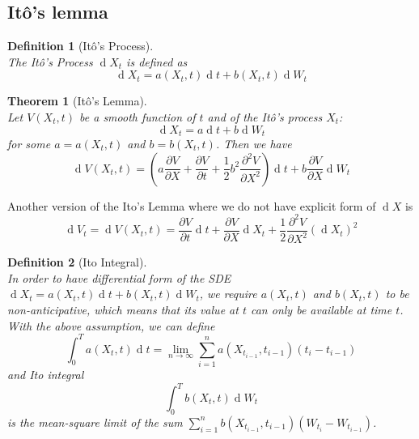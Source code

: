 \documentclass[12pt]{article}
\newtheorem{definition}{Definition}[section]
\newtheorem{theorem}{Theorem}[section]
\theoremstyle{definition}
\DeclareMathOperator{\diff}{d}
\begin{document}
\subsection{It\^{o}'s lemma}
\begin{definition}[It\^{o}'s Process]
\hfill\\\normalfont The It\^{o}'s Process $\diff X_t$ is defined as 
\[
\diff X_t = a(X_t,t)\diff t + b(X_t,t)\diff W_t
\]
\end{definition}
\begin{theorem}[It\^{o}'s Lemma]
\hfill\\\normalfont Let $V(X_t,t)$ be a smooth function of $t$ and of the It\^{o}'s process $X_t$:
\[
\diff X_t = a\diff t + b\diff W_t
\]
for some $a=a(X_t,t)$ and $b=b(X_t,t)$. Then we have
\[
\diff V(X_t,t) = (a\frac{\partial V}{\partial X}+\frac{\partial V}{\partial t}+\frac{1}{2}b^2\frac{\partial^2 V}{\partial X^2})\diff t+b\frac{\partial V}{\partial X}\diff W_t
\]
\end{theorem}
Another version of the Ito's Lemma where we do not have explicit form of $\diff X$ is
\[
\diff V_t = \diff V(X_t,t) = \frac{\partial V}{\partial t}\diff t+\frac{\partial V}{\partial X}\diff X_t + \frac{1}{2}\frac{\partial^2 V}{\partial X^2}(\diff X_t)^2 
\]
\begin{definition}[Ito Integral]
\hfill\\\normalfont In order to have differential form of the SDE $\diff X_t = a(X_t,t)\diff t+b(X_t,t)\diff W_t$, we require $a(X_t,t)$ and $b(X_t,t)$ to be non-anticipative, which means that its value at $t$ can only be available at time $t$.\\
With the above assumption, we can define
\[
\int_0^T a(X_t,t)\diff t = \lim_{n\to \infty}\sum_{i=1}^n a(X_{t_{i-1}}, t_{i-1})(t_i-t_{i-1})
\]
and Ito integral
\[
\int_0^T b(X_t,t)\diff W_t
\]
is the mean-square limit of the sum $\sum_{i=1}^n b(X_{t_{i-1}}, t_{i-1})(W_{t_i}-W_{t_{i-1}})$.
\end{definition}
\end{document}
